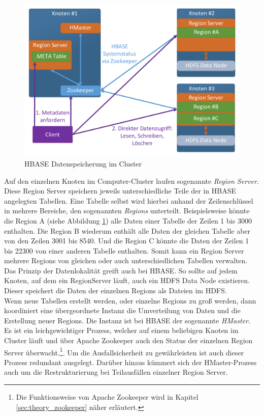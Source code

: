 \begin{figure}[ht]
  \centering
  \includegraphics[width=\textwidth]{./resource/hbase_cluster_architecture.pdf}
  \caption{HBASE Datenspeicherung im Cluster}
  \label{fig:hbase_cluster_architecture}
\end{figure}

\noindent
Auf den einzelnen Knoten im Computer-Cluster laufen sogenannte \textit{Region Server}. Diese Region Server speichern jeweils unterschiedliche Teile der in HBASE angelegten Tabellen. Eine Tabelle selbst wird hierbei anhand der Zeilenschlüssel in mehrere Bereiche, den sogenannten \textit{Regions} unterteilt. Beispielsweise könnte die Region A (siehe Abbildung \ref{fig:hbase_cluster_architecture}) alle Daten einer Tabelle der Zeilen 1 bis 3000 enthalten. Die Region B wiederum enthält alle Daten der gleichen Tabelle aber von den Zeilen 3001 bis 8540. Und die Region C könnte die Daten der Zeilen 1 bis 22300 von einer anderen Tabelle enthalten. Somit kann ein Region Server mehrere Regions von gleichen oder auch unterschiedlichen Tabellen verwalten.  Das Prinzip der Datenlokalität greift auch bei HBASE. So sollte auf  jedem Knoten, auf dem ein RegionServer läuft, auch ein HDFS Data Node existieren. Dieser speichert die Daten der einzelnen Regions als Dateien im HDFS.\\

\noindent
Wenn neue Tabellen erstellt werden, oder einzelne Regions zu groß werden, dann koordiniert eine übergeordnete Instanz die Umverteilung von Daten und die Erstellung neuer Regions. Die Instanz ist bei HBASE der sogenannte \textit{HMaster}. Es ist ein leichgewichtiger Prozess, welcher auf einem beliebigen Knoten im Cluster läuft und über Apache Zookeeper auch den Status der einzelnen Region Server überwacht.\footnote{Die Funktionsweise von Apache Zookeeper wird in Kapitel \ref{sec:theory_zookeeper} näher erläutert.}. Um die Ausfallsicherheit zu gewährleisten ist auch dieser Prozess redundant ausgelegt. Darüber hinaus kümmert sich der HMaster-Prozess auch um die Restrukturierung bei Teilausfällen einzelner Region Server. 

